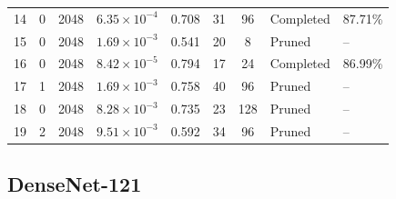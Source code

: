 {\begin{longtable}{lccccccll}
14 & 0 & 2048 & $6.35\times10^{-4}$ & 0.708 & 31 & 96 & Completed & 87.71\% \\
15 & 0 & 2048 & $1.69\times10^{-3}$ & 0.541 & 20 & 8 & Pruned & -- \\
16 & 0 & 2048 & $8.42\times10^{-5}$ & 0.794 & 17 & 24 & Completed & 86.99\% \\
17 & 1 & 2048 & $1.69\times10^{-3}$ & 0.758 & 40 & 96 & Pruned & -- \\
18 & 0 & 2048 & $8.28\times10^{-3}$ & 0.735 & 23 & 128 & Pruned & -- \\
19 & 2 & 2048 & $9.51\times10^{-3}$ & 0.592 & 34 & 96 & Pruned & -- \\
\end{longtable}
}

\Needspace*{0.6\textheight}
\subsection{DenseNet-121}

